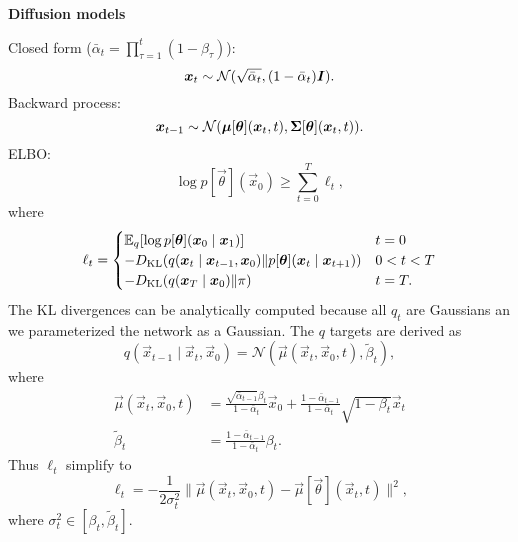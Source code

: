 \documentclass[10pt]{article}
\newenvironment{topic}[1]
{\textbf{\sffamily \colorbox{black}{\rlap{\textbf{\textcolor{white}{#1}}}\hspace{\linewidth}\hspace{-2\fboxsep}}}}
{}
\newenvironment{subtopic}[1]
{\begin{center}\textbf{\sffamily #1}\end{center}}
{}
\begin{document}
\begin{multicols*}{3}
\begin{topic}{Generative models}
\begin{subtopic}{Diffusion models}
            Closed form ($\bar{\alpha}_t = \prod_{\tau=1}^t (1-\beta_{\tau})$): \[
                \bm{x}_t \sim \mathcal{N}(\sqrt{\bar{\alpha}_t}, (1-\bar{\alpha}_t) \bm{I}).
            \]
            Backward process: \[
                \bm{x}_{t-1} \sim \mathcal{N}(\bm{\mu}[\bm{\theta}](\bm{x}_t, t), \bm{\Sigma}[\bm{\theta}](\bm{x}_t, t)).
            \]
            ELBO: \[
                \log p[\vec{\theta}](\vec{x}_0) \geq \sum_{t=0}^{T} \ell_t,
            \]
            where \[
                \ell_t = \begin{cases}
                    \mathbb{E}_q[\log p[\bm{\theta}](\bm{x}_0 \mid \bm{x}_1)]                                                          & t = 0     \\
                    -D_{\mathrm{KL}}(q(\bm{x}_t \mid \bm{x}_{t-1}, \bm{x}_0) \| p[\bm{\theta}](\bm{x}_t \mid \bm{x}_{t+1})) & 0 < t < T \\
                    -D_{\mathrm{KL}}(q(\bm{x}_T \mid \bm{x}_0) \| \pi)                                                          & t = T.
                \end{cases}
            \]
            The KL divergences can be analytically computed because all $q_t$ are Gaussians an we parameterized
            the network as a Gaussian. The $q$ targets are derived as \[
                q(\vec{x}_{t-1} \mid \vec{x}_t, \vec{x}_0) = \mathcal{N}(\vec{\mu}(\vec{x}_t, \vec{x}_0, t), \tilde{\beta}_t),
            \]
            where
            \begin{align*}
                \vec{\mu}(\vec{x}_t, \vec{x}_0, t) & = \frac{\sqrt{\bar{\alpha}_{t-1}} \beta_t}{1-\bar{\alpha}_t} \vec{x}_0 + \frac{1-\bar{\alpha}_{t-1}}{1-\bar{\alpha}_t} \sqrt{1-\beta_t} \vec{x}_t \\
                \tilde{\beta}_t                    & = \frac{1-\bar{\alpha}_{t-1}}{1-\bar{\alpha}_t} \beta_t.
            \end{align*}
            Thus $\ell_t$ simplify to \[
                \ell_t = -\frac{1}{2 \sigma_t^2} \| \vec{\mu}(\vec{x}_t, \vec{x}_0, t) - \vec{\mu}[\vec{\theta}](\vec{x}_t,t) \|^2,
            \]
            where $\sigma_t^2 \in [\beta_t, \tilde{\beta}_t]$.


\end{subtopic}
\end{topic}
\end{multicols*}
\end{document}
